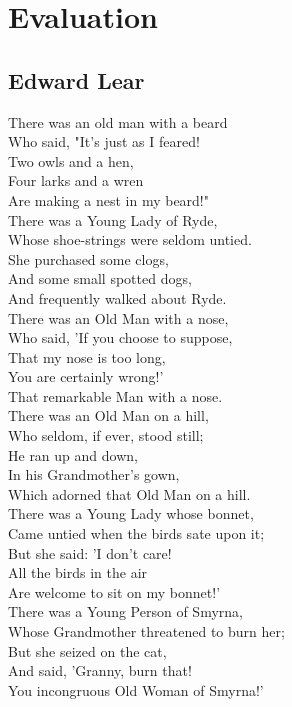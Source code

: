\section{Evaluation}

\subsection{Edward Lear}
\label{sec:lear}
There was an old man with a beard\\
Who said, "It's just as I feared!\\
Two owls and a hen,\\
Four larks and a wren\\
Are making a nest in my beard!"\\

There was a Young Lady of Ryde,\\
Whose shoe-strings were seldom untied.\\
She purchased some clogs,\\
And some small spotted dogs,\\
And frequently walked about Ryde.\\


There was an Old Man with a nose,\\
Who said, 'If you choose to suppose,\\
That my nose is too long,\\
You are certainly wrong!'\\
That remarkable Man with a nose.\\

There was an Old Man on a hill,\\
Who seldom, if ever, stood still;\\
He ran up and down,\\
In his Grandmother's gown,\\
Which adorned that Old Man on a hill.\\

There was a Young Lady whose bonnet,\\
Came untied when the birds sate upon it;\\
But she said: 'I don't care!\\
All the birds in the air\\
Are welcome to sit on my bonnet!'\\


There was a Young Person of Smyrna,\\
Whose Grandmother threatened to burn her;\\
But she seized on the cat,\\
And said, 'Granny, burn that!\\
You incongruous Old Woman of Smyrna!'\\


